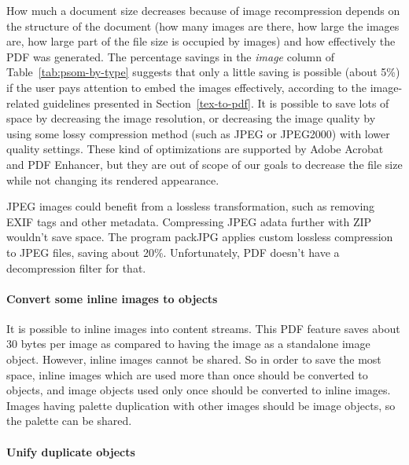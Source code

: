 \documentclass{ltugproc}
\begin{document}
How much a document size decreases because of image recompression depends on
the structure of the document (how many images are there, how large the
images are, how large part of the file size is occupied by images) and how
effectively the PDF was generated. The percentage savings in the
\emph{image} column of Table~\ref{tab:psom-by-type} suggests that only a little
saving is possible (about 5\%) if the user pays attention to embed the
images effectively, according to the image-related guidelines presented in
Section~\ref{tex-to-pdf}. It is possible to save lots of space by decreasing
the image resolution, or decreasing the image quality by using some lossy
compression method (such as JPEG or JPEG2000) with lower quality settings.
These kind of optimizations are supported by Adobe Acrobat and PDF Enhancer,
but they are out of scope of our goals to decrease the file size while not
changing its rendered appearance.

JPEG images could benefit from a lossless transformation, such as removing
EXIF tags and other metadata. Compressing JPEG adata further with ZIP
wouldn't save space. The program packJPG \cite{packJPG} applies custom lossless
compression to JPEG files, saving about 20\%. Unfortunately, PDF doesn't
have a decompression filter for that.

\paragraph{Convert some inline images to objects}

It is possible to inline images into content streams. This PDF feature saves
about 30 bytes per image as compared to having the image as a standalone
image object. However, inline images cannot be shared. So in order to save
the most space, inline images which are used more than once should be
converted to objects, and image objects used only once should be converted
to inline images. Images having palette duplication with other images should
be image objects, so the palette can be shared.

\paragraph{Unify duplicate objects}
\end{document}
